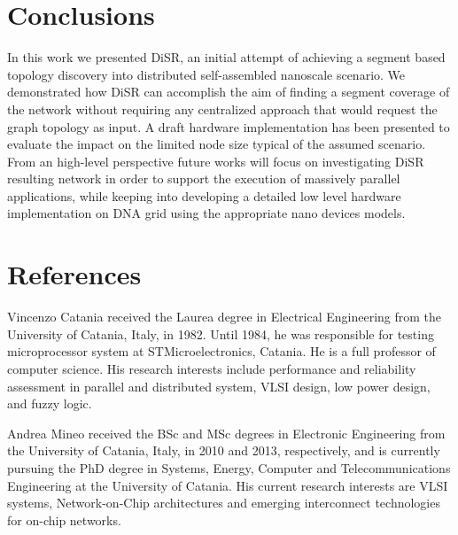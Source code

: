 \documentclass[preprint]{elsarticle}
\newcommand{\disr}{{\sf DiSR}}
\begin{document}







\section{Conclusions}
In this work we presented \disr{}, an initial attempt of achieving a segment based
topology discovery into distributed self-assembled nanoscale scenario. We
demonstrated how \disr{} can accomplish the aim of finding a segment
coverage of the network without requiring any centralized approach
that would request the graph topology as input. A draft hardware
implementation has been presented to evaluate the impact on the limited
node size typical of the assumed scenario. From an high-level
perspective future works will focus on
investigating \disr{} resulting network in order to support the
execution of massively parallel applications, while keeping into
developing a detailed low level hardware implementation on
DNA grid using the appropriate nano devices models.


%
% 
%

%
\section*{References}

\vspace{10 mm}

Vincenzo Catania received the Laurea degree in Electrical Engineering
from the University of Catania, Italy, in 1982. Until 1984, he was
responsible for testing microprocessor system at STMicroelectronics,
Catania. He is a full professor of computer
science. His research interests include performance and reliability
assessment in parallel and distributed system, VLSI design, low power
design, and fuzzy logic.

Andrea Mineo received the BSc and MSc degrees in Electronic
Engineering from the University of Catania, Italy, in 2010 and 2013,
respectively, and is currently pursuing the PhD degree in Systems,
Energy, Computer and Telecommunications Engineering at the University
of Catania. His current research interests are VLSI systems,
Network-on-Chip architectures and emerging interconnect technologies
for on-chip networks.
\end{document}
